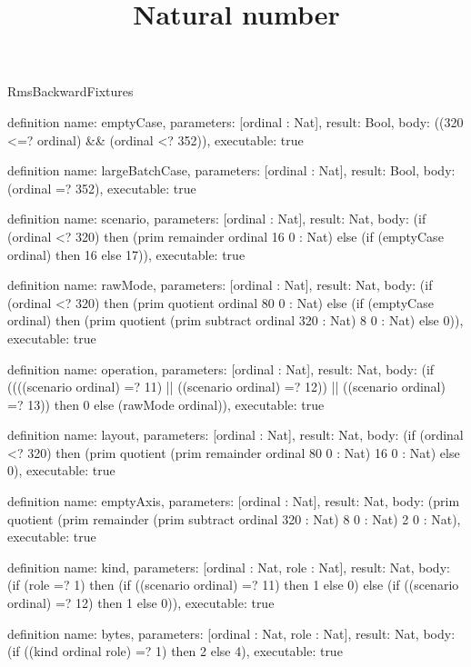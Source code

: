 \begin{lexlean}{RmsBackwardFixtures}
\title{Natural number}
\begin{semanticmodule}
definition{
  name: emptyCase,
  parameters: [ordinal : Nat],
  result: Bool,
  body: ((320 <=? ordinal) && (ordinal <? 352)),
  executable: true
}

definition{
  name: largeBatchCase,
  parameters: [ordinal : Nat],
  result: Bool,
  body: (ordinal =? 352),
  executable: true
}

definition{
  name: scenario,
  parameters: [ordinal : Nat],
  result: Nat,
  body: (if (ordinal <? 320) then (prim remainder ordinal 16 0 : Nat) else (if (emptyCase ordinal) then 16 else 17)),
  executable: true
}

definition{
  name: rawMode,
  parameters: [ordinal : Nat],
  result: Nat,
  body: (if (ordinal <? 320) then (prim quotient ordinal 80 0 : Nat) else (if (emptyCase ordinal) then (prim quotient (prim subtract ordinal 320 : Nat) 8 0 : Nat) else 0)),
  executable: true
}

definition{
  name: operation,
  parameters: [ordinal : Nat],
  result: Nat,
  body: (if ((((scenario ordinal) =? 11) || ((scenario ordinal) =? 12)) || ((scenario ordinal) =? 13)) then 0 else (rawMode ordinal)),
  executable: true
}

definition{
  name: layout,
  parameters: [ordinal : Nat],
  result: Nat,
  body: (if (ordinal <? 320) then (prim quotient (prim remainder ordinal 80 0 : Nat) 16 0 : Nat) else 0),
  executable: true
}

definition{
  name: emptyAxis,
  parameters: [ordinal : Nat],
  result: Nat,
  body: (prim quotient (prim remainder (prim subtract ordinal 320 : Nat) 8 0 : Nat) 2 0 : Nat),
  executable: true
}

definition{
  name: kind,
  parameters: [ordinal : Nat, role : Nat],
  result: Nat,
  body: (if (role =? 1) then (if ((scenario ordinal) =? 11) then 1 else 0) else (if ((scenario ordinal) =? 12) then 1 else 0)),
  executable: true
}

definition{
  name: bytes,
  parameters: [ordinal : Nat, role : Nat],
  result: Nat,
  body: (if ((kind ordinal role) =? 1) then 2 else 4),
  executable: true
}


\end{semanticmodule}
\end{lexlean}
